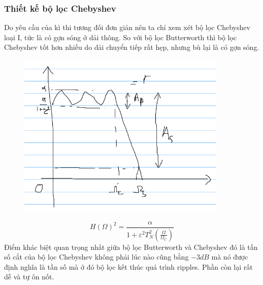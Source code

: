 \documentclass{article}
\begin{document}
\subsubsection{Thiết kế bộ lọc Chebyshev}
Do yêu cầu của kì thi tương đối đơn giản nên ta chỉ xem xét bộ lọc Chebyshev loại I, tức là có gợn sóng ở dải thông. So với 
bộ lọc Butterworth thì bộ lọc Chebyshev tốt hơn nhiều do dải chuyển tiếp rất hẹp, nhưng bù lại là có gợn sóng.
\begin{figure}[H]
  \begin{center}
  \includegraphics[width=10cm]{che.png}
  \end{center}
  \end{figure}
$$H(\Omega)^2=\frac{\alpha}{1+\varepsilon^2T_{N}^2(\frac{\Omega}{\Omega_{C}})}$$
Điểm khác biệt quan trọng nhất giữa bộ lọc Butterworth và Chebyshev đó là tần số cắt của bộ lọc Chebyshev không phải lúc nào cũng bằng $-3dB$ 
mà nó được định nghĩa là tần số mà ở đó bộ lọc kết thúc quá trình ripples. Phần còn lại rất dễ và tự ôn nốt.
\end{document}
